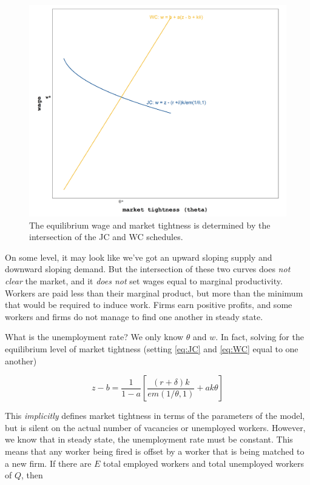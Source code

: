 \documentclass[12pt]{article}
\begin{document}
\begin{figure}[htb]
\begin{center}
	\includegraphics[height = .33\textheight]{eqm_wj.png}
\end{center}
\caption{The equilibrium wage and market tightness is determined by the intersection of the JC and WC schedules.}\label{fig:wcjc}
\end{figure}

On some level, it may look like we've got an upward sloping supply and downward sloping demand.  But the intersection of these two curves does \textit{not clear} the market, and it \textit{does not} set wages equal to marginal productivity.  Workers are paid less than their marginal product, but more than the minimum that would be required to induce work. Firms earn positive profits, and some workers and firms do not manage to find one another in steady state.

What {is} the unemployment rate? We only know $\theta$ and $w$.  In fact, solving for the equilibrium level of market tightness (setting \eqref{eq:JC} and \eqref{eq:WC} equal to one another)

$$z - b = \frac{1}{1-a} \left[ \frac{(r + \delta )k}{em(1/\theta,1)} + a k \theta  \right] $$

This \textit{implicitly} defines market tightness in terms of the parameters of the model, but is silent on the actual number of vacancies or unemployed workers.  However, we know that in steady state, the unemployment rate must be constant.  This means that any worker being fired is offset by a worker that is being matched to a new firm. If there are $E$ total employed workers and total unemployed workers of $Q$, then
\end{document}
